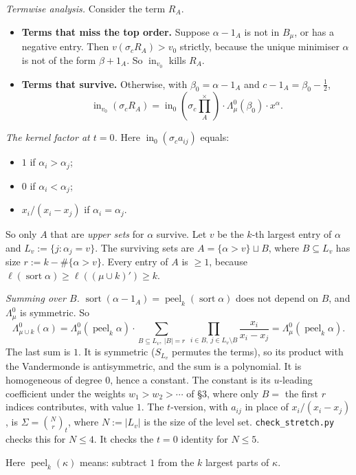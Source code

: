 \documentclass[11pt]{article}
\theoremstyle{definition}
\newcommand{\prodx}{\textstyle\prod^{\times}}
\newcommand{\sort}{\operatorname{sort}}
\newcommand{\inn}{\operatorname{in}}
\newcommand{\peelk}{\operatorname{peel}_k}
\newcommand{\file}[1]{\texttt{#1}}
\begin{document}
\noindent\emph{Termwise analysis.} Consider the term $R_A$.
\begin{itemize}
\item \textbf{Terms that miss the top order.} Suppose $\alpha - 1_A$ is not in $B_\mu$, or has a negative entry. Then $v(\sigma_cR_A) > v_0$ strictly, because the unique minimiser $\alpha$ is not of the form $\beta + 1_A$. So $\inn_{v_0}$ kills $R_A$.
\item \textbf{Terms that survive.} Otherwise, with $\beta_0 = \alpha - 1_A$ and $c - 1_A = \beta_0 - \tfrac12$,
\[
\inn_{v_0}(\sigma_cR_A) = \inn_0(\sigma_c \prodx_A) \cdot \Lambda^0_\mu(\beta_0) \cdot x^\alpha.
\]
\end{itemize}

\noindent\emph{The kernel factor at $t = 0$.} Here $\inn_0(\sigma_c a_{ij})$ equals:
\begin{itemize}
\item $1$ if $\alpha_i > \alpha_j$;
\item $0$ if $\alpha_i < \alpha_j$;
\item $x_i/(x_i - x_j)$ if $\alpha_i = \alpha_j$.
\end{itemize}
So only $A$ that are \emph{upper sets} for $\alpha$ survive. Let $v$ be the $k$-th largest entry of $\alpha$ and $L_v := \{j : \alpha_j = v\}$. The surviving sets are $A = \{\alpha > v\} \sqcup B$, where $B \subseteq L_v$ has size $r := k - \#\{\alpha > v\}$. Every entry of $A$ is $\ge 1$, because $\ell(\sort\alpha) \ge \ell((\mu\cup k)') \ge k$.

\noindent\emph{Summing over $B$.} $\sort(\alpha - 1_A) = \peelk(\sort\alpha)$ does not depend on $B$, and $\Lambda^0_\mu$ is symmetric. So
\[
\Lambda^0_{\mu\cup k}(\alpha) = \Lambda^0_\mu(\peelk\alpha) \cdot \sum_{B\subseteq L_v,\ |B|=r}\ \prod_{i\in B,\ j\in L_v\setminus B} \frac{x_i}{x_i - x_j} = \Lambda^0_\mu(\peelk\alpha).
\]
The last sum is $1$. It is symmetric ($S_{L_v}$ permutes the terms), so its product with the Vandermonde is antisymmetric, and the sum is a polynomial. It is homogeneous of degree $0$, hence a constant. The constant is its $u$-leading coefficient under the weights $w_1 > w_2 > \cdots$ of \S3, where only $B =$ the first $r$ indices contributes, with value $1$. The $t$-version, with $a_{ij}$ in place of $x_i/(x_i-x_j)$, is $\Sigma = \binom{N}{r}_t$, where $N := |L_v|$ is the size of the level set. \file{check\_stretch.py} checks this for $N \le 4$. It checks the $t=0$ identity for $N \le 5$.

Here $\peelk(\kappa)$ means: subtract $1$ from the $k$ largest parts of $\kappa$.
\end{document}
